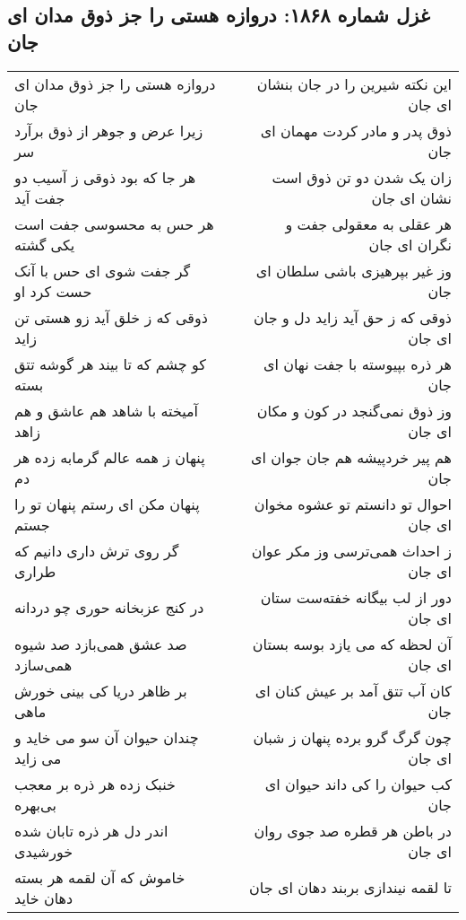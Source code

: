 \begin{center}
\section*{غزل شماره ۱۸۶۸: دروازه هستی را جز ذوق مدان ای جان}
\label{sec:1868}
\begin{longtable}{l p{0.5cm} r}
دروازه هستی را جز ذوق مدان ای جان
&&
این نکته شیرین را در جان بنشان ای جان
\\
زیرا عرض و جوهر از ذوق برآرد سر
&&
ذوق پدر و مادر کردت مهمان ای جان
\\
هر جا که بود ذوقی ز آسیب دو جفت آید
&&
زان یک شدن دو تن ذوق است نشان ای جان
\\
هر حس به محسوسی جفت است یکی گشته
&&
هر عقلی به معقولی جفت و نگران ای جان
\\
گر جفت شوی ای حس با آنک حست کرد او
&&
وز غیر بپرهیزی باشی سلطان ای جان
\\
ذوقی که ز خلق آید زو هستی تن زاید
&&
ذوقی که ز حق آید زاید دل و جان ای جان
\\
کو چشم که تا بیند هر گوشه تتق بسته
&&
هر ذره بپیوسته با جفت نهان ای جان
\\
آمیخته با شاهد هم عاشق و هم زاهد
&&
وز ذوق نمی‌گنجد در کون و مکان ای جان
\\
پنهان ز همه عالم گرمابه زده هر دم
&&
هم پیر خردپیشه هم جان جوان ای جان
\\
پنهان مکن ای رستم پنهان تو را جستم
&&
احوال تو دانستم تو عشوه مخوان ای جان
\\
گر روی ترش داری دانیم که طراری
&&
ز احداث همی‌ترسی وز مکر عوان ای جان
\\
در کنج عزبخانه حوری چو دردانه
&&
دور از لب بیگانه خفته‌ست ستان ای جان
\\
صد عشق همی‌بازد صد شیوه همی‌سازد
&&
آن لحظه که می یازد بوسه بستان ای جان
\\
بر ظاهر دریا کی بینی خورش ماهی
&&
کان آب تتق آمد بر عیش کنان ای جان
\\
چندان حیوان آن سو می خاید و می زاید
&&
چون گرگ گرو برده پنهان ز شبان ای جان
\\
خنبک زده هر ذره بر معجب بی‌بهره
&&
کب حیوان را کی داند حیوان ای جان
\\
اندر دل هر ذره تابان شده خورشیدی
&&
در باطن هر قطره صد جوی روان ای جان
\\
خاموش که آن لقمه هر بسته دهان خاید
&&
تا لقمه نیندازی بربند دهان ای جان
\\
\end{longtable}
\end{center}
